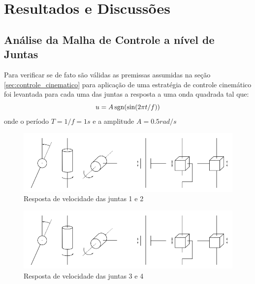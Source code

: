 \chapter{Resultados e Discussões}

\section{Análise da Malha de Controle a nível de Juntas}
Para verificar se de fato são válidas as premissas assumidas na seção \ref{sec:controle_cinematico} para aplicação de uma estratégia de controle cinemático foi levantada para cada uma das juntas a resposta a uma onda quadrada tal que:
\[ u = A \operatorname{sgn}(\sin( 2\pi t/f)) \]
onde o período $T = 1/f = 1s$ e a amplitude $A = 0.5 rad/s$

\newlength{\imageheight}
\begin{figure}[H]
  \centering
    \includegraphics[width=\textwidth, clip=true, trim = 0 0.5\imageheight 0 0 0 mm]{./img/joints}
  \caption{Resposta de velocidade das juntas 1 e 2}
\end{figure}

\begin{figure}[H]
  \centering
    \includegraphics[width=\textwidth, clip=true, trim = 0 0 0 0.5\imageheight 0 mm]{./img/joints}
  \caption{Resposta de velocidade das juntas 3 e 4}
\end{figure}


